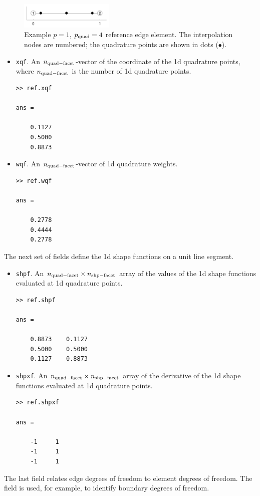 \documentclass[openany,preprint,11pt]{article}
\begin{document}
\begin{figure}[!h]
  \centering
  \includegraphics[width=0.4\textwidth]{ref_p1_1d}
  \caption{Example $p=1$, $p_{\rm quad} = 4$ reference edge element.  The interpolation nodes are numbered; the quadrature points are shown in dots ($\bullet$).}
\end{figure}
\begin{itemize}
\item \texttt{xqf}. An $n_{\rm quad-facet}$-vector of the coordinate of the 1d quadrature points, where $n_{\rm quad-facet}$ is the number of 1d quadrature points.
\begin{verbatim}
>> ref.xqf

ans =

    0.1127
    0.5000
    0.8873
\end{verbatim}
\item \texttt{wqf}. An $n_{\rm quad-facet}$-vector of 1d quadrature weights.
\begin{verbatim}
>> ref.wqf

ans =

    0.2778
    0.4444
    0.2778
\end{verbatim}
\end{itemize}
The next set of fields define the 1d shape functions on a unit line segment. 
\begin{itemize}
\item \texttt{shpf}. An $n_{\rm quad-facet} \times n_{\rm shp-facet}$ array of the values of the 1d shape functions evaluated at 1d quadrature points.
\begin{verbatim}
>> ref.shpf

ans =

    0.8873    0.1127
    0.5000    0.5000
    0.1127    0.8873
\end{verbatim}
\item \texttt{shpxf}. An $n_{\rm quad-facet} \times n_{\rm shp-facet}$ array of the derivative of the 1d shape functions evaluated at 1d quadrature points.
\begin{verbatim}
>> ref.shpxf

ans =

    -1     1
    -1     1
    -1     1
\end{verbatim}
\end{itemize}
The last field relates edge degrees of freedom to element degrees of freedom.  The field is used, for example, to identify boundary degrees of freedom.
\end{document}
